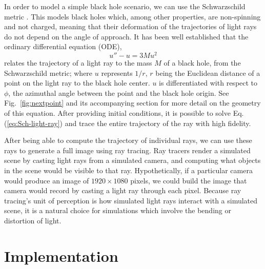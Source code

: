 In order to model a simple black hole scenario, we can use the Schwarzschild metric \cite{schw_soln-2007}.
This models black holes which, among other properties, are non-spinning and not charged,
meaning that their deformation of the trajectories of light rays do not depend on the angle of approach.
It has been well established \cite{gravitation-mtw} that the ordinary differential equation (ODE),
\begin{equation}
	u'' - u = 3 M u^2
	\label{eq:Sch-light-ray}
\end{equation}
relates the trajectory of a light ray to the mass $M$ of a black hole, from the Schwarzschild metric;
where $u$ represents $1/r$, $r$ being the Euclidean distance of a point on the light ray to the black hole center.
$u$ is differentiated with respect to $\phi$, the azimuthal angle between the point and the black hole origin.
See Fig.~\ref{fig:nextpoint} and its accompanying section for more detail on the geometry of this equation.
After providing initial conditions,  it is possible to solve Eq.(\ref{eq:Sch-light-ray}) and trace the entire trajectory of the ray with high fidelity.

After being able to compute the trajectory of individual rays, we can use these rays to generate a full image using ray tracing. Ray tracers render a simulated scene by casting light rays from a simulated camera, and computing what objects in the scene would be visible to that ray. Hypothetically, if a particular camera would produce an image of $1920 \times 1080$ pixels, we could build the image that camera would record by casting a light ray through each pixel. Because ray tracing's unit of perception is how simulated light rays interact with a simulated scene, it is a natural choice for simulations which involve the bending or distortion of light.




\section{Implementation}
\label{sec:impl}


